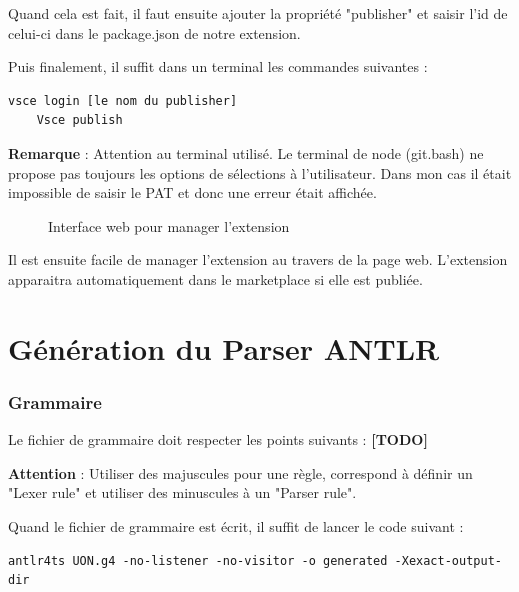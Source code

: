 \documentclass[
    iict, %
    il, %
]{heig-tb}
\begin{document}
Quand cela est fait, il faut ensuite ajouter la propriété "publisher" et saisir l'id de celui-ci dans le package.json de notre extension.

Puis finalement, il suffit dans un terminal les commandes suivantes :
\begin{lstlisting}[frame=single]
    vsce login [le nom du publisher]
    Vsce publish
\end{lstlisting}

\textbf{Remarque} : Attention au terminal utilisé. Le terminal de node (git.bash) ne propose pas toujours les options de sélections à l'utilisateur. Dans mon cas il était impossible de saisir le PAT et donc une erreur était affichée.

\begin{figure}[!h]
    \begin{center}
    \end{center}
    \caption[Interface web pour manager l'extension]{\label{manage-publisher} Interface web pour manager l'extension}
\end{figure}

Il est ensuite facile de manager l'extension au travers de la page web.
L'extension apparaitra automatiquement dans le marketplace si elle est publiée.


\section{Génération du Parser ANTLR}
\subsubsection{Grammaire}
Le fichier de grammaire doit respecter les points suivants : \textbf{[TODO]}

\textbf{Attention} : Utiliser des majuscules pour une règle, correspond à définir un "Lexer rule" et utiliser des minuscules à un  "Parser rule".

Quand le fichier de grammaire est écrit, il suffit de lancer le code suivant :

\begin{lstlisting}[frame=single]
    antlr4ts UON.g4 -no-listener -no-visitor -o generated -Xexact-output-dir
\end{lstlisting}
\end{document}
